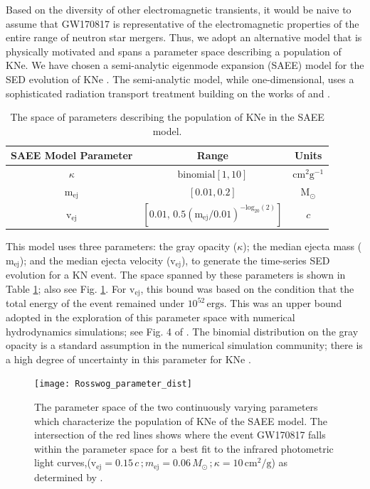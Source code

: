 Based on the diversity of other electromagnetic transients, it would be naive to assume that GW170817 is representative of the electromagnetic properties of the entire range of neutron star mergers. Thus, we adopt an alternative model that is physically motivated and spans a parameter space describing a population of KNe. We have chosen a semi-analytic eigenmode expansion (SAEE) model for the SED evolution of KNe \citep{Rosswog2018}. The semi-analytic model, while one-dimensional, uses a sophisticated radiation transport treatment building on the works of \citet{Wollaeger2017} and \citet{Pinto2000}.
\begin{table}[h!]
  \centering
  \begin{tabular}{c|c|c}
    SAEE Model Parameter & Range & Units \\
    \hline
    $\kappa$ & $\mathrm{binomial}[1, 10]$ & $\mathrm{cm^2 g^{-1}}$ \\
    \hline
    $\mathrm{m_{ej}}$ & $[0.01, 0.2]$ & $\mathrm{M_{\odot}}$ \\
    \hline
    $\mathrm{v_{ej}}$ & $[0.01, \, 0.5 (\mathrm{m_{ej}}/0.01)^{-\mathrm{log}_{20}(2)}]$ & $c$
  \end{tabular}
  \caption{The space of parameters describing the population of KNe in the SAEE model.}
  \label{tab: ross_params}
\end{table}

This model uses three parameters: the gray opacity ($\kappa$); the median ejecta mass ($\mathrm{m_{ej}}$); and the median ejecta velocity ($\mathrm{v_{ej}}$), to generate the time-series SED evolution for a KN event. The space spanned by these parameters is shown in Table \ref{tab: ross_params}; also see Fig. \ref{fig: ross_params}. For $\mathrm{v_{ej}}$, this bound was based on the condition that the total energy of the event remained under $10^{52}\, \mathrm{ergs}$. This was an upper bound adopted in the exploration of this parameter space with numerical hydrodynamics simulations; see Fig. 4 of \citet{Rosswog2016a}. The binomial distribution on the gray opacity is a standard assumption in the numerical simulation community; there is a high degree of uncertainty in this parameter for KNe \citep{Rosswog2018, Kasen2013}.

\begin{figure}[t!]
  \centering
  \texttt{[image: Rosswog\_parameter\_dist]}
  \caption{The parameter space of the two continuously varying parameters which characterize the population of KNe of the SAEE model. The intersection of the red lines shows where the event GW170817 falls within the parameter space for a best fit to the infrared photometric light curves,($ \mathrm{v_{ej}} = 0.15\,c\,; m_{\mathrm{ej}} = 0.06 \, M_{\odot}\,; \kappa =10 \, \mathrm{cm^2 /g}$) as determined by \citet{Rosswog2018}.}\label{fig: ross_params}
\end{figure}


